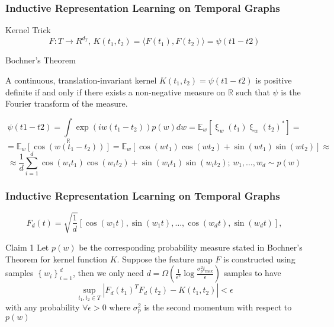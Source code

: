 \documentclass[fleqn, xcolor=x11names]{beamer}
\begin{document}
\begin{frame}\frametitle{Inductive Representation Learning on Temporal Graphs}

\begin{block}{Kernel Trick}
$$ F: T \rightarrow R^{d_T},\, K(t_1, t_2) = \langle F(t_1), F(t_2) \rangle = \psi(t1-t2) $$
\end{block}

\begin{block}{Bochner’s Theorem}

A continuous, translation-invariant kernel $K(t_1, t_2) =  \psi(t1-t2)$
is positive definite if and only if there exists a non-negative measure on $\mathbb{R}$ such that $\psi$ is the
Fourier transform of the measure.

\end{block}

$$ \psi(t1-t2) = \int \limits_{\mathbb{R}} \exp \left(iw(t_1 - t_2) \right) p(w) dw
 = \mathbb{E}_w \left[ \upxi_w(t_1) \upxi_w(t_2)^{*}  \right] = 
 $$ 
$$ = \mathbb{E}_w \left[ \cos(w(t_1-t_2)) \right] 
= \mathbb{E}_w \left[ \cos(wt_1)\cos(wt_2) + \sin(wt_1)\sin(wt_2)  \right] \approx $$
$$ \approx \frac{1}{d} \sum \limits_{i=1}^{d} 
\cos(w_it_1)\cos(w_it_2) + \sin(w_it_1)\sin(w_it_2); \, w_1, \dots, w_d \sim p(w)$$


\end{frame}

\begin{frame}\frametitle{Inductive Representation Learning on Temporal Graphs}

$$ F_d(t) = \sqrt{\frac{1}{d}} \left[\cos(w_1t),\sin(w_1t),\dots,   \cos(w_dt),\sin(w_dt) \right],$$

\begin{block}{Claim 1}
Let $p(w)$ be the corresponding probability measure stated in Bochner’s Theorem for kernel function $K$.  Suppose the feature map $F$  is constructed using samples $\left\lbrace w_i \right\rbrace_{i=1}^d$, then we only need $  d = \Omega \left( \frac{1}{\epsilon^2} \log \frac{\sigma^2_p t_{\max}}{\epsilon} \right) $ 
samples to have
$$ \sup \limits_{t_1, t_2 \in T} | F_d(t_1)^T F_d(t_2) - K(t_1, t_2)| < \epsilon$$ with any probability $\forall\epsilon > 0 $ where $ \sigma^2_p $ 
is the second momentum with respect to $p(w)$
\end{block}

\end{frame}
\end{document}
